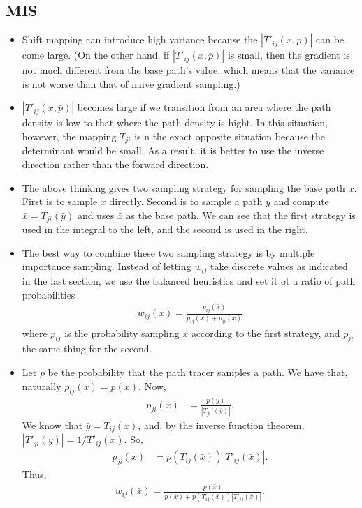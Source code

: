 \documentclass[10pt]{article}
\begin{document}
  \subsection{MIS}
  \begin{itemize}
  	\item Shift mapping can introduce high variance because the $|T'_{ij}(x, \bar p)|$ can be come large.  (On the other hand, if $|T'_{ij}(x, \bar p)|$ is small, then the gradient is not much different from the base path's value, which means that the variance is not worse than that of naive gradient sampling.)

  	\item $|T'_{ij}(x, \bar p)|$ becomes large if we transition from an area where the path density is low to that where the path density is hight.  In this situation, however, the mapping $T_{ji}$ is n the exact opposite situation because the determinant would be small.  As a result, it is better to use the inverse direction rather than the forward direction.

  	\item The above thinking gives two sampling strategy for sampling the base path $\bar x$.  First is to sample $\bar x$ directly.  Second is to sample a path $\bar y$ and compute $\bar x = T_{ji}(\bar y)$ and uses $\bar x$ as the base path.  We can see that the first strategy is used in the integral to the left, and the second is used in the right.

  	\item The best way to combine these two sampling strategy is by multiple importance sampling.  Instead of letting $w_{ij}$ take discrete values as indicated in the last section, we use the balanced heuristics and set it ot a ratio of path probabilities
  	\begin{align*}
  		w_{ij}(\bar x) = \frac{p_{ij}(\bar x)}{p_{ij}(\bar x) + p_{ji}(\bar x)}
  	\end{align*}
  	where $p_{ij}$ is the probability sampling $\bar x$ according to the first strategy, and $p_{ji}$ the same thing for the second.

  	\item Let $p$ be the probability that the path tracer samples a path.  We have that, naturally $p_{ij}(x) = p(x)$.  Now,
  	\begin{align*}
  	 	p_{ji}(x) &= \frac{p(y)}{|T_{ji}'(\bar y)|}.  	 	
  	 \end{align*} 
  	 We know that $\bar y = T_{ij}(x)$, and, by the inverse function theorem, $|T'_{ji}(\bar y)| = 1/{T'_{ij}(\bar x)}$. So,
  	 \begin{align*}
  	 	p_{ji}(x) &= p(T_{ij}(\bar x))| T'_{ij}(\bar x) |.
  	 \end{align*}
  	 Thus,
  	 \begin{align*}
  	 	w_{ij}(\bar x) = \frac{p(\bar x)}{p(\bar x) + p(T_{ij}(\bar x))| T'_{ij}(\bar x) |}.
  	 \end{align*}
  \end{itemize}
\end{document}
